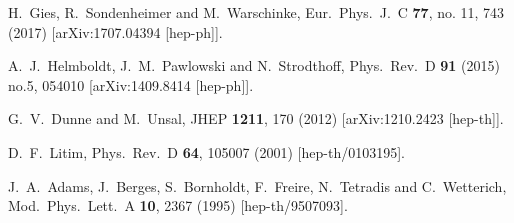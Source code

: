 \documentclass[aps,prd,11pt,tightenlines,superscriptaddress,nofootinbib,preprintnumbers,notitlepage]{revtex4-1}
\begin{document}
\begin{thebibliography}{99}
  H.~Gies, R.~Sondenheimer and M.~Warschinke,
  Eur.\ Phys.\ J.\ C {\bf 77}, no. 11, 743 (2017)
  [arXiv:1707.04394 [hep-ph]].

  A.~J.~Helmboldt, J.~M.~Pawlowski and N.~Strodthoff,
  Phys.\ Rev.\ D {\bf 91} (2015) no.5,  054010
  [arXiv:1409.8414 [hep-ph]].

  G.~V.~Dunne and M.~Unsal,
  JHEP {\bf 1211}, 170 (2012)
  [arXiv:1210.2423 [hep-th]].

  D.~F.~Litim,
  Phys.\ Rev.\ D {\bf 64}, 105007 (2001)
  [hep-th/0103195].

  J.~A.~Adams, J.~Berges, S.~Bornholdt, F.~Freire, N.~Tetradis and C.~Wetterich,
  Mod.\ Phys.\ Lett.\ A {\bf 10}, 2367 (1995)
  [hep-th/9507093].
  

\end{thebibliography}
\end{document}
